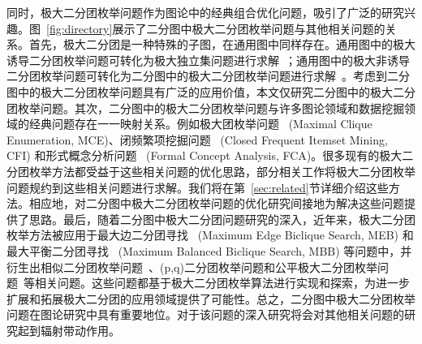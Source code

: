 同时，极大二分团枚举问题作为图论中的经典组合优化问题，吸引了广泛的研究兴趣。图~\ref{fig:directory}展示了二分图中极大二分团枚举问题与其他相关问题的关系。首先，极大二分团是一种特殊的子图，在通用图中同样存在。通用图中的极大诱导二分团枚举问题可转化为极大独立集问题进行求解~\cite{MBE-induced21}；通用图中的极大非诱导二分团枚举问题可转化为二分图中的极大二分团枚举问题进行求解~\cite{Proof09}。考虑到二分图中的极大二分团枚举问题具有广泛的应用价值，本文仅研究二分图中的极大二分团枚举问题。其次，二分图中的极大二分团枚举问题与许多图论领域和数据挖掘领域的经典问题存在一一映射关系。例如极大团枚举问题~\cite{MCE20,MCE-GPU21,MCE22} (Maximal Clique Enumeration, MCE)、闭频繁项挖掘问题~\cite{CFI98,CFI22} (Closed Frequent Itemset Mining, CFI) 和形式概念分析问题~\cite{FCA21,FCA22} (Formal Concept Analysis, FCA)。很多现有的极大二分团枚举方法都受益于这些相关问题的优化思路，部分相关工作将极大二分团枚举问题规约到这些相关问题进行求解。我们将在第~\ref{sec:related}节详细介绍这些方法。相应地，对二分图中极大二分团枚举问题的优化研究间接地为解决这些问题提供了思路。最后，随着二分图中极大二分团问题研究的深入，近年来，极大二分团枚举方法被应用于最大边二分团寻找~\cite{MEB20,MEB22} (Maximum Edge Biclique Search, MEB) 和最大平衡二分团寻找~\cite{MBB21} (Maximum Balanced Biclique Search, MBB) 等问题中，并衍生出相似二分团枚举问题~\cite{SimilarMBE22}、(p,q)二分团枚举问题\cite{PQ21}和公平极大二分团枚举问题~\cite{FairMBE23}等相关问题。这些问题都基于极大二分团枚举算法进行实现和探索，为进一步扩展和拓展极大二分团的应用领域提供了可能性。总之，二分图中极大二分团枚举问题在图论研究中具有重要地位。对于该问题的深入研究将会对其他相关问题的研究起到辐射带动作用。


